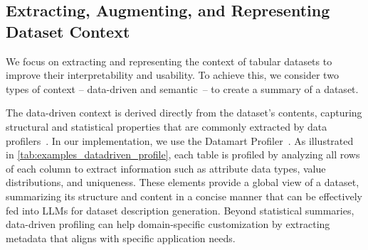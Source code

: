 \subsection{Extracting, Augmenting, and Representing Dataset Context}
\label{sec:solution_STA}

We focus on extracting and representing the context of tabular datasets to improve their interpretability and usability. 
% 
To achieve this, we consider two types of context -- data-driven and semantic~-- to create a summary of a dataset. 
% 


The data-driven context is derived directly from the dataset's contents, capturing structural and statistical properties that are commonly extracted by data profilers~\cite{abedjan2015profiling, naumann2014data,datamart-profiler}. 
In our implementation, we use the Datamart Profiler~\cite{datamart-profiler}. 
% 
As illustrated in \autoref{tab:examples_datadriven_profile}, each table is profiled by analyzing all rows of each column to extract information such as attribute data types, value distributions, and uniqueness.
% 
These elements provide a global view of a dataset, summarizing its structure and content in a concise manner that can be effectively fed into LLMs for dataset description generation.
% 
Beyond statistical summaries, data-driven profiling can help domain-specific customization by extracting metadata that aligns with specific application needs. 


